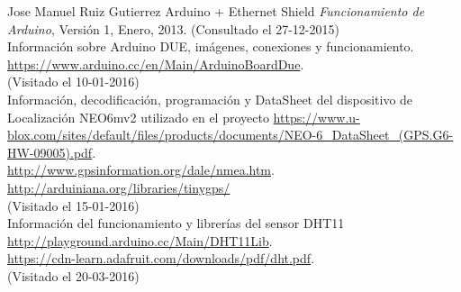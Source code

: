 \begin{thebibliography}{10}




Jose Manuel Ruiz Gutierrez
\newblock Arduino + Ethernet Shield
\newblock \textit{Funcionamiento de Arduino}, Versión 1, Enero, 2013.
\newblock (Consultado el 27-12-2015) \\


Información sobre Arduino DUE, imágenes, conexiones y funcionamiento.
\url{https://www.arduino.cc/en/Main/ArduinoBoardDue}.\\
\newblock (Visitado el 10-01-2016) \\

Información, decodificación, programación y DataSheet del dispositivo de Localización NEO6mv2 utilizado en el proyecto
\url{https://www.u-blox.com/sites/default/files/products/documents/NEO-6_DataSheet_(GPS.G6-HW-09005).pdf}.\\
\url{http://www.gpsinformation.org/dale/nmea.htm}.\\
\url{http://arduiniana.org/libraries/tinygps/}\\
\newblock (Visitado el 15-01-2016) \\

Información del funcionamiento y librerías del sensor DHT11
\url{http://playground.arduino.cc/Main/DHT11Lib}.\\
\url{https://cdn-learn.adafruit.com/downloads/pdf/dht.pdf}.\\
\newblock (Visitado el 20-03-2016) \\


\end{thebibliography}

